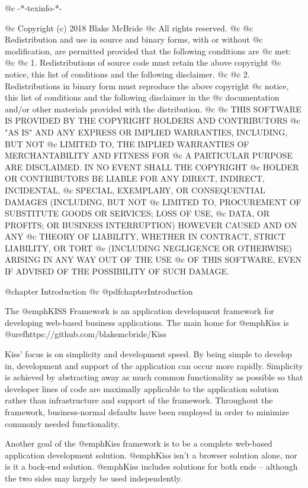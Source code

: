 @c -*-texinfo-*-

@c  Copyright (c) 2018 Blake McBride
@c  All rights reserved.
@c
@c  Redistribution and use in source and binary forms, with or without
@c  modification, are permitted provided that the following conditions are
@c  met:
@c
@c  1. Redistributions of source code must retain the above copyright
@c  notice, this list of conditions and the following disclaimer.
@c
@c  2. Redistributions in binary form must reproduce the above copyright
@c  notice, this list of conditions and the following disclaimer in the
@c  documentation and/or other materials provided with the distribution.
@c
@c  THIS SOFTWARE IS PROVIDED BY THE COPYRIGHT HOLDERS AND CONTRIBUTORS
@c  "AS IS" AND ANY EXPRESS OR IMPLIED WARRANTIES, INCLUDING, BUT NOT
@c  LIMITED TO, THE IMPLIED WARRANTIES OF MERCHANTABILITY AND FITNESS FOR
@c  A PARTICULAR PURPOSE ARE DISCLAIMED. IN NO EVENT SHALL THE COPYRIGHT
@c  HOLDER OR CONTRIBUTORS BE LIABLE FOR ANY DIRECT, INDIRECT, INCIDENTAL,
@c  SPECIAL, EXEMPLARY, OR CONSEQUENTIAL DAMAGES (INCLUDING, BUT NOT
@c  LIMITED TO, PROCUREMENT OF SUBSTITUTE GOODS OR SERVICES; LOSS OF USE,
@c  DATA, OR PROFITS; OR BUSINESS INTERRUPTION) HOWEVER CAUSED AND ON ANY
@c  THEORY OF LIABILITY, WHETHER IN CONTRACT, STRICT LIABILITY, OR TORT
@c  (INCLUDING NEGLIGENCE OR OTHERWISE) ARISING IN ANY WAY OUT OF THE USE
@c  OF THIS SOFTWARE, EVEN IF ADVISED OF THE POSSIBILITY OF SUCH DAMAGE.


@chapter Introduction
@c @pdfchapter{Introduction}

The @emph{KISS Framework} is an application development framework for
developing web-based business applications.  The main home for @emph{Kiss}
is @uref{https://github.com/blakemcbride/Kiss}


Kiss' focus is on
simplicity and development speed.  By being simple to develop in,
development and support of the application can occur more rapidly.
Simplicity is achieved by abstracting away as much common
functionality as possible so that developer lines of code are
maximally applicable to the application solution rather than infrastructure and
support of the framework.  Throughout the framework, business-normal
defaults have been employed in order to minimize commonly needed
functionality.

Another goal of the @emph{Kiss} framework is to be a complete web-based
application development solution.  @emph{Kiss} isn't a browser solution
alone, nor is it a back-end solution.  @emph{Kiss} includes solutions for
both ends -- although the two sides may largely be used independently.

